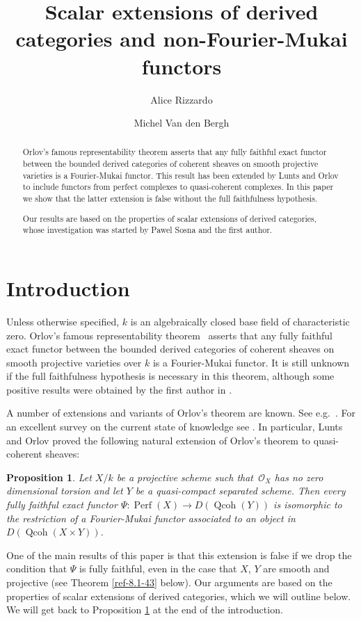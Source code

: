 \documentclass{amsart}
\title[Scalar extensions of derived categories]{Scalar extensions of derived categories and non-Fourier-Mukai functors}
\author{Alice Rizzardo}
\author{Michel Van den Bergh}
\numberwithin{equation}{section}
\let\cal\mathcal
\newtheorem{proposition}[lemma]{Proposition}
\theoremstyle{definition}
\theoremstyle{remark}
\begin{document}
\begin{abstract}
Orlov's famous representability theorem asserts that any fully faithful exact functor between the bounded derived categories
of coherent sheaves on smooth projective varieties is a Fourier-Mukai functor. This result has been
extended by Lunts and Orlov to include functors from perfect complexes to quasi-coherent complexes.
In this paper we show that the latter extension is false without the full faithfulness hypothesis.

Our results are based on the properties of scalar extensions of derived categories, whose
investigation was started by Pawel Sosna and the first author.
\end{abstract}
\maketitle
\setcounter{tocdepth}{1}
\tableofcontents
\section{Introduction}
Unless otherwise specified, $k$ is an algebraically closed base field
of characteristic zero.  Orlov's famous representability
theorem~\cite[Thm 2.2]{Orlov4} asserts that any fully faithful exact functor
between the bounded derived categories of coherent sheaves on smooth
projective varieties over $k$ is a Fourier-Mukai functor. It is still unknown
if the full faithfulness hypothesis is necessary in this theorem,
although some positive results were obtained by the first author in
\cite{Rizzardo1}.

A number of extensions and variants of Orlov's theorem are known. See e.g.\ \cite{Ballard,COV,CS4,CS3,CS2,Kawamata2,OrlovLunts}. For an excellent survey on the current state of knowledge see \cite{CS1}.
In particular, Lunts and Orlov proved the following natural extension of Orlov's theorem to quasi-coherent sheaves:
{
\begin{proposition} \cite[Corollary 9.13(2)]{OrlovLunts}
\label{ref-A-0}
Let $X/k$ be a projective scheme such that~${{\cal O}}_X$ has no zero dimensional torsion
 and let $Y$ be
 a quasi-compact separated scheme. Then every fully faithful exact functor $\Psi :{\operatorname{Perf}} (X){\rightarrow}
  D({\operatorname{Qcoh}}(Y))$ is isomorphic to the restriction of a Fourier-Mukai functor associated to an
object in $D({\operatorname{Qcoh}}(X\times Y))$.
\end{proposition}
} 
One of the main results of this paper is that this extension
is false if we drop the condition that $\Psi$ is fully
faithful, even in the case that $X$, $Y$ are smooth and projective (see Theorem \ref{ref-8.1-43} below).
Our arguments are based on the properties of scalar extensions of
derived categories, which we will outline below.  We will get back to
Proposition \ref{ref-A-0} at the end of the introduction.
\end{document}
